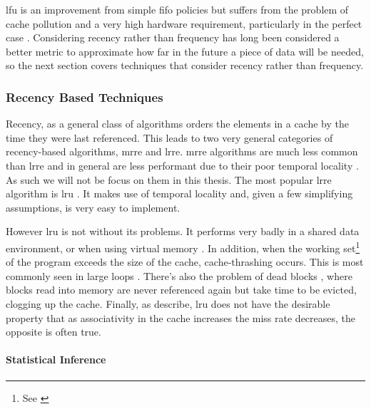 \gls{lfu} is an improvement from simple \gls{fifo} policies but suffers from the problem of cache pollution and a very high hardware requirement, particularly in the perfect case \cite{podlipnigSurveyWebCache2003}. Considering recency rather than frequency has long been considered a better metric to approximate how far in the future a piece of data will be needed, so the next section covers techniques that consider recency rather than frequency. 

\subsubsection{Recency Based Techniques}
\label{sec:recency}

Recency, as a general class of algorithms orders the elements in a cache by the time they were last referenced. This leads to two very general categories of recency-based algorithms, \gls{mrre} and \gls{lrre}. \gls{mrre} algorithms are much less common than \gls{lrre} and in general are less performant due to their poor temporal locality \cite{pandaSurveyReplacementStrategies2016}. As such we will not be focus on them in this thesis. The most popular \gls{lrre} algorithm is \gls{lru} \cite{pitkowSimpleRobustCaching1994, karedlaCachingStrategiesImprove1994, smithCacheMemories1982}. It makes use of temporal locality and, given a few simplifying assumptions, is very easy to implement.

However \gls{lru} is not without its problems. It performs very badly in a shared data environment, or when using virtual memory \cite{bansalCARClockAdaptive2004}. In addition, when the working set\footnote{See \cite{denningWorkingSetModel1968}} of the program exceeds the size of the cache, cache-thrashing \cite{denningThrashingItsCauses1968} occurs. This is most commonly seen in large loops \cite{linPredictingLastTouchReferences2002}. There's also the problem of dead blocks \cite{liuCacheBurstsNew2008}, where blocks read into memory are never referenced again but take time to be evicted, clogging up the cache. Finally, as \citet{linPredictingLastTouchReferences2002} describe, \gls{lru} does not have the desirable property that as associativity in the cache increases the miss rate decreases, the opposite is often true.

\paragraph{Statistical Inference}

